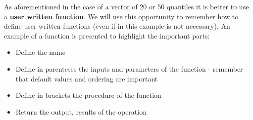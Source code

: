 \documentclass[]{book}
\providecommand{\tightlist}{%
  \setlength{\itemsep}{0pt}\setlength{\parskip}{0pt}}
\begin{document}
As aforementioned in the case of a vector of 20 or 50 quantiles it is
better to use a \textbf{user written function}. We will use this
opportunity to remember how to define user written functions (even if in
this example is not necessary). An example of a function is presented to
highlight the important parts:

\begin{itemize}
\tightlist
\item
  Define the name
\item
  Define in parenteses the inputs and parameters of the function -
  remember that default values and ordering are important
\item
  Define in brackets the procedure of the function
\item
  Return the output, results of the operation
\end{itemize}
\end{document}
